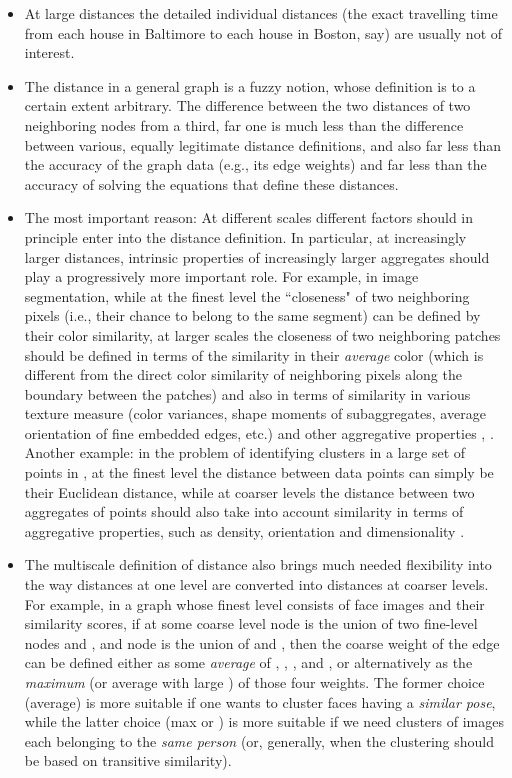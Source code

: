 \documentclass[final]{siamltex}
\begin{document}
\begin{itemize}
    \item At large distances the detailed individual distances (the exact travelling time from each house in Baltimore to each house in Boston, say)
    are usually not of interest.
    \item The distance in a general graph is a fuzzy notion, whose
    definition is to a certain  extent arbitrary. The difference
    between the two distances of two neighboring nodes from a
    third, far one is much less than the difference between various,
    equally legitimate distance definitions, and also far less than the
    accuracy of the graph data (e.g., its edge weights) and far
    less than the accuracy of solving the equations that define these
    distances.
    \item The most important reason: At different scales different
    factors should in principle enter into the distance
    definition. In particular, at increasingly larger distances,
    intrinsic properties of increasingly larger aggregates should
    play a progressively more important role. For example, in image
    segmentation, while at the finest level the ``closeness"  of
    two neighboring pixels (i.e., their chance to belong to the same
    segment) can be defined by their color similarity, at larger
    scales the closeness of two neighboring patches should be
    defined in terms of the similarity in their {\it average}
    color (which is different from the direct color similarity of
    neighboring pixels along the boundary between the patches) and also in
    terms of similarity in various texture measure (color variances,
    shape moments of subaggregates, average orientation of fine embedded
    edges, etc.) and other aggregative properties \cite{segm}, \cite{Nature}. Another example: in the
    problem of identifying clusters in a large set of points in
    , at the finest level the distance between data points
    can simply be their Euclidean distance, while at coarser
    levels the distance between two aggregates of points should
    also take into account similarity in terms of aggregative
    properties, such as density, orientation and  dimensionality     \cite{Dan1}.
    \item The multiscale definition of distance also brings much
    needed flexibility into the way distances at one level are
    converted into distances at coarser levels. For example, in a
    graph whose finest level consists of face images and their
    similarity scores, if at some coarse level node  is the
    union of  two fine-level nodes  and , and node
     is the union of  and , then the coarse weight
     of the edge  can be defined either as some
    {\it average} of , , , and
    , or alternatively as the {\it maximum} (or 
    average with large ) of those four weights. The former
    choice (average)  is more suitable if one wants to cluster
     faces having a {\it similar pose}, while the latter
    choice (max or ) is more suitable if we need clusters of
    images each belonging to the {\it same person} (or, generally,
    when the clustering should be based on transitive similarity).
\end{itemize}
\end{document}
